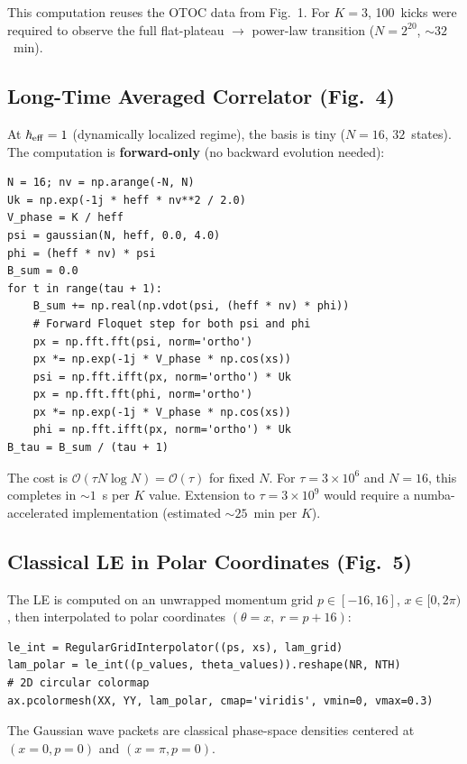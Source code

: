 \documentclass[11pt,a4paper]{article}
\newcommand{\hb}{\hbar_{\rm eff}}
\begin{document}
This computation reuses the OTOC data from Fig.~1. For $K=3$, 100~kicks were required to observe the full flat-plateau $\to$ power-law transition ($N=2^{20}$, $\sim32$~min).

\subsection{Long-Time Averaged Correlator (Fig.~4)}

At $\hb=1$ (dynamically localized regime), the basis is tiny ($N=16$, $32$~states). The computation is \textbf{forward-only} (no backward evolution needed):

\begin{lstlisting}
N = 16; nv = np.arange(-N, N)
Uk = np.exp(-1j * heff * nv**2 / 2.0)
V_phase = K / heff
psi = gaussian(N, heff, 0.0, 4.0)
phi = (heff * nv) * psi
B_sum = 0.0
for t in range(tau + 1):
    B_sum += np.real(np.vdot(psi, (heff * nv) * phi))
    # Forward Floquet step for both psi and phi
    px = np.fft.fft(psi, norm='ortho')
    px *= np.exp(-1j * V_phase * np.cos(xs))
    psi = np.fft.ifft(px, norm='ortho') * Uk
    px = np.fft.fft(phi, norm='ortho')
    px *= np.exp(-1j * V_phase * np.cos(xs))
    phi = np.fft.ifft(px, norm='ortho') * Uk
B_tau = B_sum / (tau + 1)
\end{lstlisting}

The cost is $\mathcal{O}(\tau N\log N)=\mathcal{O}(\tau)$ for fixed $N$. For $\tau=3\times10^{6}$ and $N=16$, this completes in $\sim1$~s per $K$ value. Extension to $\tau=3\times10^{9}$ would require a numba-accelerated implementation (estimated $\sim25$~min per $K$).

\subsection{Classical LE in Polar Coordinates (Fig.~5)}

The LE is computed on an unwrapped momentum grid $p\in[-16,16]$, $x\in[0,2\pi)$, then interpolated to polar coordinates $(\theta=x,\; r=p+16)$:
\begin{lstlisting}
le_int = RegularGridInterpolator((ps, xs), lam_grid)
lam_polar = le_int((p_values, theta_values)).reshape(NR, NTH)
# 2D circular colormap
ax.pcolormesh(XX, YY, lam_polar, cmap='viridis', vmin=0, vmax=0.3)
\end{lstlisting}

The Gaussian wave packets are classical phase-space densities centered at $(x=0,p=0)$ and $(x=\pi,p=0)$.
\end{document}
